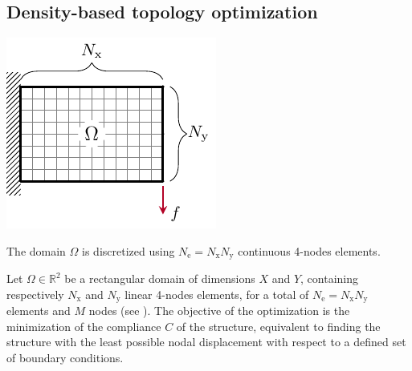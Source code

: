 \subsection{Density-based topology optimization}

\begin{marginfigure}
    \centering
    \includegraphics{figures/02_literature/01_contin_mesh/c_mesh.pdf}
    \caption{The domain $\Omega$ is discretized using $N_\text{e}=N_\text{x} N_\text{y}$ continuous 4-nodes elements.}
    \label{fig:02_mesh_c}
\end{marginfigure}
Let $\Omega \in \mathbb{R}^2$ be a rectangular domain of dimensions $X$ and $Y$, containing respectively $N_\text{x}$ and $N_\text{y}$ linear 4-nodes elements, for a total of $N_\text{e}=N_\text{x} N_\text{y}$ elements and $M$ nodes (see ). The objective of the optimization is the minimization of the compliance $C$ of the structure, equivalent to finding the structure with the least possible nodal displacement with respect to a defined set of boundary conditions. 

